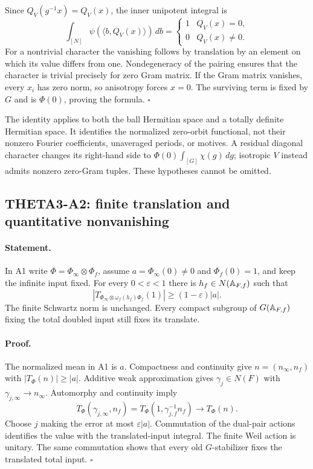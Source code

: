 \documentclass[11pt]{article}
\theoremstyle{definition}\newtheorem{definition}[theorem]{Definition}\newtheorem{remark}[theorem]{Remark}
\begin{document}
Since $Q_V(g^{-1}x)=Q_V(x)$, the inner unipotent integral is
\[
 \int_{[N]}\psi(\langle b,Q_V(x)\rangle)\,db
 =\begin{cases}1&Q_V(x)=0,\\0&Q_V(x)\ne0.\end{cases}
\]
For a nontrivial character the vanishing follows by translation by an
element on which its value differs from one. Nondegeneracy of the
pairing ensures that the character is trivial precisely for zero Gram
matrix. If the Gram matrix vanishes, every $x_i$ has zero norm, so
anisotropy forces $x=0$. The surviving term is fixed by $G$ and is
$\Phi(0)$, proving the formula. $\square$

The identity applies to both the ball Hermitian space and a totally
definite Hermitian space. It identifies the normalized zero-orbit
functional, not their nonzero Fourier coefficients, unaveraged periods,
or motives. A residual diagonal character changes its right-hand side
to $\Phi(0)\int_{[G]}\chi(g)\,dg$; isotropic $V$ instead admits
nonzero zero-Gram tuples. These hypotheses cannot be omitted.

\subsection{THETA3-A2: finite translation and quantitative nonvanishing}\label{A2}

\paragraph{Statement.}
In A1 write $\Phi=\Phi_\infty\otimes\Phi_f$, assume
$a=\Phi_\infty(0)\ne0$ and $\Phi_f(0)=1$, and keep the infinite input
fixed. For every $0<\varepsilon<1$ there is $h_f\in N(\mathbb A_{F,f})$
such that
\[
 \left|T_{\Phi_\infty\otimes\omega_f(h_f)\Phi_f}(1)\right|
                   \geq(1-\varepsilon)|a|.
\]
The finite Schwartz norm is unchanged. Every compact subgroup of
$G(\mathbb A_{F,f})$ fixing the total doubled input still fixes its translate.

\paragraph{Proof.}
The normalized mean in A1 is $a$. Compactness and continuity give
$n=(n_\infty,n_f)$ with $|T_\Phi(n)|\geq|a|$. Additive weak
approximation gives $\gamma_j\in N(F)$ with
$\gamma_{j,\infty}\longrightarrow n_\infty$. Automorphy and
continuity imply
\[
 T_\Phi(\gamma_{j,\infty},n_f)
 =T_\Phi(1,\gamma_{j,f}^{-1}n_f)
 \longrightarrow T_\Phi(n).
\]
Choose $j$ making the error at most $\varepsilon|a|$. Commutation of
the dual-pair actions identifies the value with the translated-input
integral. The finite Weil action is unitary. The same commutation shows
that every old $G$-stabilizer fixes the translated total input.
$\square$
\end{document}
